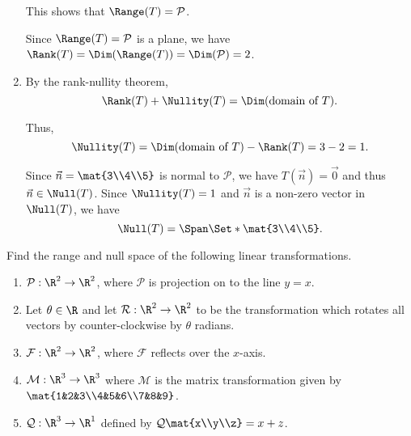 \begin{exercises}
\begin{problist}
\begin{solution}
\begin{enumerate}
				This shows that $\Range(T)=\mathcal{P}$.
				
				Since $\Range(T)=\mathcal{P}$ is a plane, we have $\Rank(T)=\Dim(\Range(T))=\Dim(\mathcal{P})=2$.

				\item
				By the rank-nullity theorem,
				\[
					\Rank(T)+\Nullity(T)=\Dim(\text{domain of $T$}).
				\]
				
				Thus,
				\[
					\Nullity(T)=\Dim(\text{domain of $T$})-\Rank(T)=3-2=1.
				\]
				
				Since $\vec{n}=\mat{3\\4\\5}$ is normal to $\mathcal{P}$, we have $T(\vec{n})=\vec{0}$ and thus $\vec{n}\in\Null(T)$. Since $\Nullity(T)=1$ and $\vec{n}$ is a non-zero vector in $\Null(T)$, we have
				\[
					\Null(T)=\Span\Set*{\mat{3\\4\\5}}.
				\]
			\end{enumerate}
		\end{solution}

		\prob Find the range and null space of the following linear
		transformations.
		\begin{enumerate}
			\item $\mathcal P:\R^{2}\to\R^{2}$, where $\mathcal P$ is
				projection on to the line $y=x$.

			\item Let $\theta\in \R$ and let $\mathcal R:\R^{2}\to\R^{2}$ to be
				the transformation which rotates all vectors by counter-clockwise
				by $\theta$ radians.

			\item $\mathcal F:\R^{2}\to\R^{2}$, where $\mathcal F$ reflects
				over the $x$-axis.

			\item $\mathcal M:\R^{3}\to\R^{3}$ where $\mathcal M$ is the matrix
				transformation given by $\mat{1&2&3\\4&5&6\\7&8&9}$.

			\item $\mathcal Q:\R^{3}\to\R^{1}$ defined by $\mathcal Q\mat{x\\y\\z}=x+z$.
		\end{enumerate}


		\begin{solution}


\end{solution}
\end{problist}
\end{exercises}
